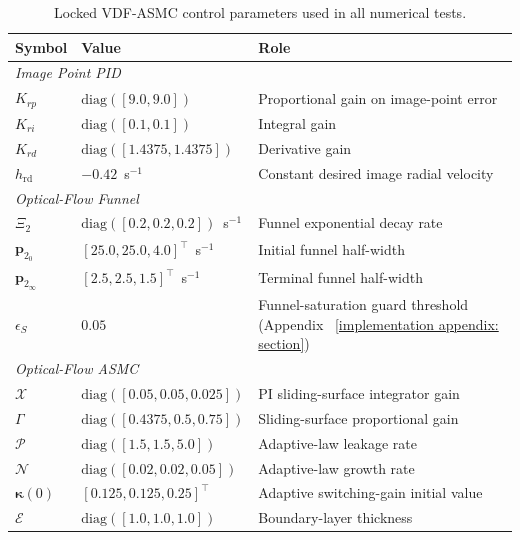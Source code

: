 \documentclass{IEEEtaes}
\begin{document}
\begin{table}[!t]
    \centering
    \footnotesize
    \caption{Locked VDF-ASMC control parameters used in all numerical tests.}
    \label{sup:control params}
    \begin{tabular}{p{} p{} p{}}
    \toprule
        \textbf{Symbol} & \textbf{Value} & \textbf{Role}\\
    \midrule
        \multicolumn{3}{l}{\textit{Image Point PID}} \\
        $K_{rp}$ & $\text{diag}([9.0,9.0])$ & Proportional gain on image-point error \\
        $K_{ri}$ & $\text{diag}([0.1,0.1])$ & Integral gain \\
        $K_{rd}$ & $\text{diag}([1.4375,1.4375])$ & Derivative gain \\
        $h_\text{rd}$ & $-0.42$~s$^{-1}$ & Constant desired image radial velocity \\
    \midrule
        \multicolumn{3}{l}{\textit{Optical-Flow Funnel}} \\
        $\Xi_2$                     & $\text{diag}([0.2,0.2,0.2])$~s$^{-1}$ & Funnel exponential decay rate \\
        $\boldsymbol{p}_{2_0}$      & $[25.0,25.0,4.0]^\top$~s$^{-1}$ & Initial funnel half-width \\
        $\boldsymbol{p}_{2_\infty}$ & $[2.5,2.5,1.5]^\top$~s$^{-1}$ & Terminal funnel half-width \\
        $\epsilon_S$                & $0.05$ & Funnel-saturation guard threshold (Appendix~
\ref{implementation appendix: section}) \\
    \midrule
        \multicolumn{3}{l}{\textit{Optical-Flow ASMC}} \\
        $\mathcal{X}$           & $\text{diag}([0.05,0.05,0.025])$ & PI sliding-surface integrator gain \\
        $\Gamma$                & $\text{diag}([0.4375,0.5,0.75])$ & Sliding-surface proportional gain \\
        $\mathcal{P}$           & $\text{diag}([1.5,1.5,5.0])$ & Adaptive-law leakage rate \\
        $\mathcal{N}$           & $\text{diag}([0.02,0.02,0.05])$ & Adaptive-law growth rate \\
        $\boldsymbol{\kappa}(0)$ & $[0.125,0.125,0.25]^\top$ & Adaptive switching-gain initial value \\
        $\mathcal{E}$           & $\text{diag}([1.0,1.0,1.0])$ & Boundary-layer thickness \\

\end{tabular}
\end{table}
\end{document}
